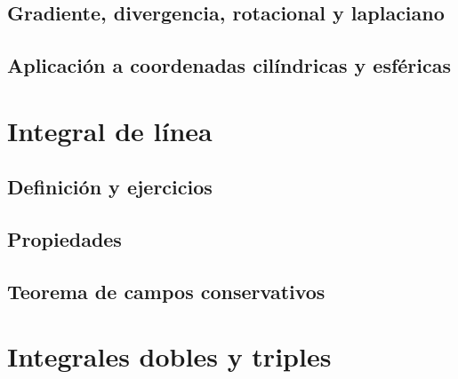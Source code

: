\documentclass[12pt,openany]{book}
\begin{document}
	   \subsection{Gradiente, divergencia, rotacional y laplaciano}

	   \subsection{Aplicaci\'on a coordenadas cil\'indricas y esf\'ericas}

	\section{Integral de l\'inea}

	   \subsection{Definici\'on y ejercicios}

	   \subsection{Propiedades}

	   \subsection{Teorema de campos conservativos}

	\section{Integrales dobles y triples}
\end{document}
